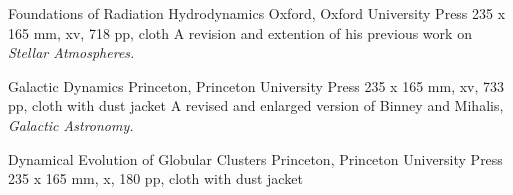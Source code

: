 {Foundations of Radiation Hydrodynamics}
{Oxford, Oxford University Press}
{235 x 165 mm, xv, 718 pp, cloth}
{}
A revision and extention of his previous work on {\it Stellar Atmospheres.}

{Galactic Dynamics}
{Princeton, Princeton University Press}
{235 x 165 mm, xv, 733 pp, cloth with dust jacket}
{}
A revised and enlarged version of Binney and Mihalis, {\it Galactic Astronomy.}

{Dynamical Evolution of Globular Clusters}
{Princeton, Princeton University Press}
{235 x 165 mm, x, 180 pp, cloth with dust jacket}
{}

